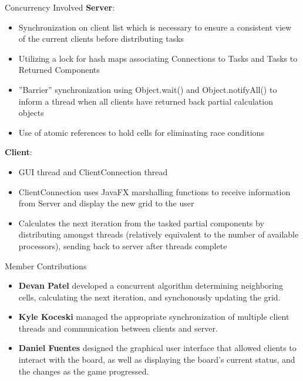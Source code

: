 \documentclass[final]{beamer}
\newlength{\onecolwid}
\begin{document}
\begin{frame}[t]
\begin{columns}[t]
\begin{column}{\onecolwid} %

\begin{block}{Concurrency Involved}
\textbf{Server}:
\begin{itemize}
\item Synchronization on client list which is necessary to ensure a consistent view of the current clients before distributing tasks
\item Utilizing a lock for hash maps associating Connections to Tasks and Tasks to Returned Components
\item ''Barrier'' synchronization using Object.wait() and Object.notifyAll() to inform a thread when all clients have returned back partial calculation objects
\item Use of atomic references to hold cells for eliminating race conditions
\end{itemize}
\textbf{Client}:
\begin{itemize}
\item GUI thread and ClientConnection thread
\item ClientConnection uses JavaFX marshalling functions to receive information from Server and display the new grid to the user
\item Calculates the next iteration from the tasked partial components by distributing amongst threads (relatively equivalent to the number of available processors), sending back to server after threads complete
\end{itemize}
\end{block}


\begin{block}{Member Contributions}

\begin{itemize}
\item \textbf{Devan Patel} developed a concurrent algorithm determining neighboring cells, calculating the next iteration, and synchonously updating the grid.
\item\textbf{Kyle Koceski} managed the appropriate synchronization of multiple client threads and communication between clients and server.
\item\textbf{Daniel Fuentes} designed the graphical user interface that allowed clients to interact with the board, as well as displaying the board's current status, and the changes as the game progressed.
\end{itemize}
\end{block}


\end{column}
\end{columns}
\end{frame}
\end{document}
